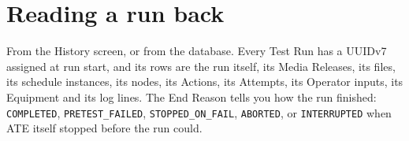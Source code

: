 \section{Reading a run back}

From the History screen, or from the database. Every Test Run has a UUIDv7 assigned at run
start, and its rows are the run itself, its Media Releases, its files, its schedule instances,
its nodes, its Actions, its Attempts, its Operator inputs, its Equipment and its log lines. The
End Reason tells you how the run finished: \texttt{COMPLETED}, \texttt{PRETEST\_FAILED},
\texttt{STOPPED\_ON\_FAIL}, \texttt{ABORTED}, or \texttt{INTERRUPTED} when ATE itself stopped
before the run could.

